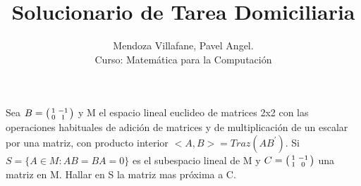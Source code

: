 \documentclass[12pt]{article}
\newenvironment{problem}[2][Problem]{\begin{trivlist}
\item[\hskip \labelsep {\bfseries #1}\hskip \labelsep {\bfseries #2.}]}{\end{trivlist}}
\newenvironment{xmat}
  {\left(\begin{smallmatrix}}
  {\end{smallmatrix}\right)}
\begin{document}
 
 
 
\title{Solucionario de Tarea Domiciliaria}%
\author{Mendoza Villafane, Pavel Angel.\\ %
Curso: Matemática para la Computación} %
 
\maketitle

 
\begin{problem}{1}
Sea $B = \begin{xmat}1 & -1\\0 & 1\end{xmat}$ y M el espacio lineal euclideo de matrices 2x2 con las operaciones habituales de adición de matrices y de multiplicación de un escalar por una matriz, con producto interior $<A,B> = Traz(AB^{'})$. Si $S=\{A \in M : AB = BA = 0\}$ es el subespacio lineal de M y $C=\begin{xmat}1 & -1\\1 & 0\end{xmat}$ una matriz en M. Hallar en S la matriz mas próxima a C.
\end{problem}
 
\end{document}
